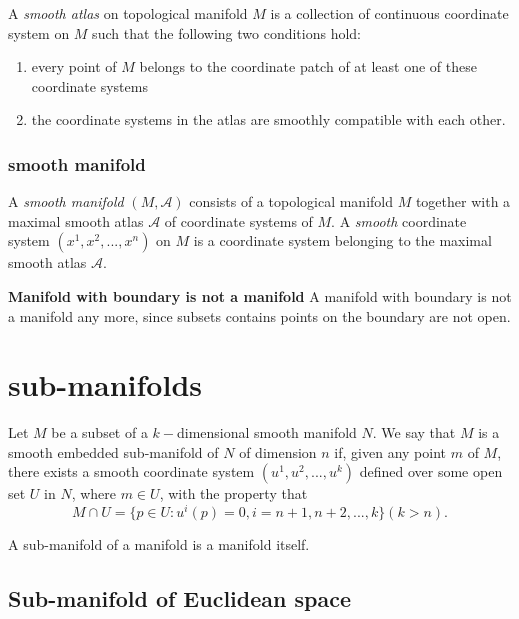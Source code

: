\begin{refsection}
\begin{definition}
A \emph{smooth atlas} on topological manifold $M$ is a collection of continuous coordinate system on $M$ such that the following two conditions hold:
\begin{enumerate}
    \item every point of $M$ belongs to the coordinate patch of at least one of these coordinate systems
    \item the coordinate systems in the atlas are smoothly compatible with each other.
\end{enumerate}
\end{definition}

\subsubsection{smooth manifold}
\begin{definition}
A \emph{smooth manifold} $(M,\mathcal{A})$ consists of a topological manifold $M$ together with a maximal smooth atlas $\mathcal{A}$ of coordinate systems of $M$. A \emph{smooth} coordinate system $(x^1,x^2,...,x^n)$ on $M$ is a coordinate system belonging to the maximal smooth atlas $\mathcal{A}$. 
\begin{mdframed}
\textbf{Manifold with boundary is not a manifold}
A manifold with boundary is not a manifold any more, since subsets contains points on the boundary are not open. 
\end{mdframed}
\end{definition}


\section{sub-manifolds}
\begin{definition}
Let $M$ be a subset of a $k-$dimensional smooth manifold $N$. We say that $M$ is a smooth embedded sub-manifold of $N$ of dimension $n$ if, given any point $m$ of $M$, there exists a smooth coordinate system $(u^1,u^2,...,u^k)$ defined over some open set $U$ in $N$, where $m \in U$, with the property that $$M \cap U = \{p\in U: u^i(p)=0, i=n+1,n+2,...,k\} (k > n).$$
\end{definition}

\begin{remark}
A sub-manifold of a manifold is a manifold itself.	
\end{remark}


\subsection{ Sub-manifold of Euclidean space}


\end{refsection}
